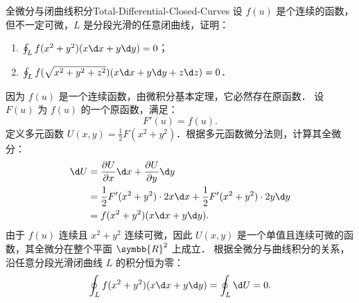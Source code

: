 \begin{problem}{全微分与闭曲线积分}{Total-Differential-Closed-Curves}
    设 $f(u)$ 是个连续的函数，但不一定可微，$L$ 是分段光滑的任意闭曲线，证明：
    \begin{enumerate}
        \item $\oint_L f(x^2 + y^2)(x \d x + y \d y) = 0$；
        \item $\oint_L f(\sqrt{x^2 + y^2 + z^2})(x \d x + y \d y + z \d z) = 0$．
    \end{enumerate}
\end{problem}

\begin{myproof}

    因为 $f(u)$ 是一个连续函数，由微积分基本定理，它必然存在原函数．
    设 $F(u)$ 为 $f(u)$ 的一个原函数，满足：
    \begin{equation}
        \label{eq:primitive-1}
        F'(u) = f(u).
    \end{equation}
    定义多元函数 $U(x, y) = \frac{1}{2} F(x^2 + y^2)$．根据多元函数微分法则，计算其全微分：
    \begin{equation}
        \label{eq:differential-1}
        \begin{aligned}
            \d U & = \frac{\partial U}{\partial x} \d x + \frac{\partial U}{\partial y} \d y           \\
                 & = \frac{1}{2} F'(x^2 + y^2) \cdot 2x \d x + \frac{1}{2} F'(x^2 + y^2) \cdot 2y \d y \\
                 & = f(x^2 + y^2)(x \d x + y \d y).
        \end{aligned}
    \end{equation}
    由于 $f(u)$ 连续且 $x^2 + y^2$ 连续可微，因此 $U(x, y)$ 是一个单值且连续可微的函数，其全微分在整个平面 $\symbb{R}^2$ 上成立．
    根据全微分与曲线积分的关系，沿任意分段光滑闭曲线 $L$ 的积分恒为零：
    \begin{equation}
        \oint_L f(x^2 + y^2)(x \d x + y \d y) = \oint_L \d U = 0.
    \end{equation}



\end{myproof}
